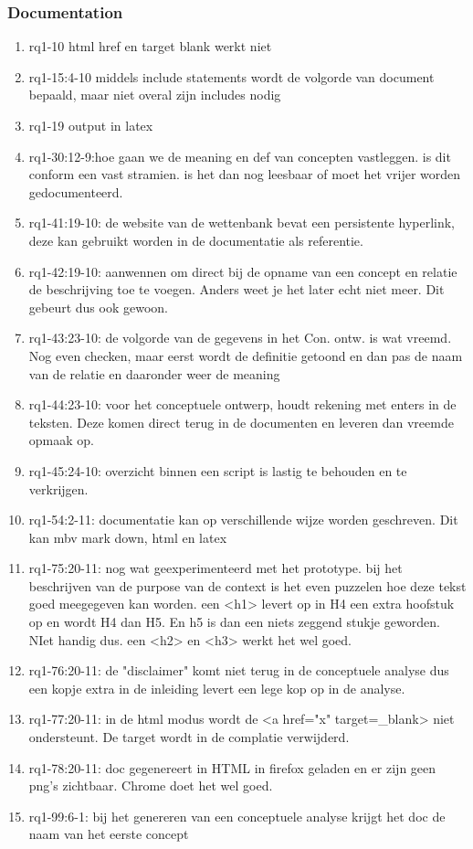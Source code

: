 \subsubsection{Documentation}
\begin{comment}
plaats hier de afgehandelde items.
\end{comment}
\begin{enumerate}
    \item rq1-10 html href en target blank werkt niet    
    \item rq1-15:4-10 middels include statements wordt de volgorde van document bepaald, maar niet overal zijn includes nodig
    \item rq1-19 output in latex 
    \item rq1-30:12-9:hoe gaan we de meaning en def van concepten vastleggen. is dit conform een vast stramien. is het dan nog leesbaar of moet het vrijer worden gedocumenteerd.
    \item rq1-41:19-10: de website van de wettenbank bevat een persistente hyperlink, deze kan gebruikt worden in de documentatie als referentie.
    \item rq1-42:19-10: aanwennen om direct bij de opname van een concept en relatie de beschrijving toe te voegen. Anders weet je het later echt niet meer. Dit gebeurt dus ook gewoon.
    \item rq1-43:23-10: de volgorde van de gegevens in het Con. ontw. is wat vreemd. Nog even checken, maar eerst wordt de definitie getoond en dan pas de naam van de relatie en daaronder weer de meaning
    \item rq1-44:23-10: voor het conceptuele ontwerp, houdt rekening met enters in de teksten. Deze komen direct terug in de documenten en leveren dan vreemde opmaak op.
    \item rq1-45:24-10: overzicht binnen een script is lastig te behouden en te verkrijgen.
    \item rq1-54:2-11: documentatie kan op verschillende wijze worden geschreven. Dit kan mbv mark down, html en latex
    \item rq1-75:20-11: nog wat geexperimenteerd met het prototype. 
    bij het beschrijven van de purpose van de context is het even puzzelen hoe deze tekst goed meegegeven kan worden. 
    een <h1> levert op in H4 een extra hoofstuk op en wordt H4 dan H5. En h5 is dan een niets zeggend stukje geworden. NIet handig dus.
    een <h2> en <h3> werkt het wel goed.
    \item rq1-76:20-11: de "disclaimer" komt niet terug in de conceptuele analyse dus een kopje extra in de inleiding levert een lege kop op in de analyse.
    \item rq1-77:20-11: in de html modus wordt de <a href="x" target=\_blank> niet ondersteunt. De target wordt in de complatie verwijderd.
    \item rq1-78:20-11: doc gegenereert in HTML in firefox geladen en er zijn geen png's zichtbaar. Chrome doet het wel goed.
    \item rq1-99:6-1: bij het genereren van een conceptuele analyse krijgt het doc de naam van het eerste concept
\end{enumerate}

